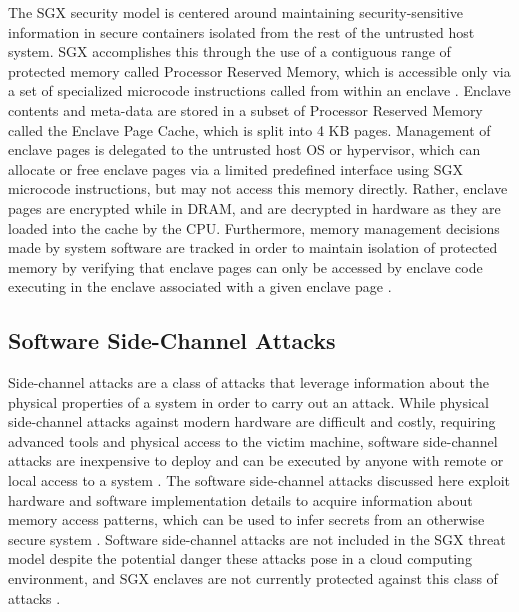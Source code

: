 The SGX security model is centered around maintaining security-sensitive information in secure containers isolated from the rest of the untrusted host system. SGX accomplishes this through the use of a contiguous range of protected memory called Processor Reserved Memory, which is accessible only via a set of specialized microcode instructions called from within an enclave \cite{costan_intel_2016}. Enclave contents and meta-data are stored in a subset of Processor Reserved Memory called the Enclave Page Cache, which is split into 4 KB pages. Management of enclave pages is delegated to the untrusted host OS or hypervisor, which can allocate or free enclave pages via a limited predefined interface using SGX microcode instructions, but may not access this memory directly. Rather, enclave pages are encrypted while in DRAM, and are decrypted in hardware as they are loaded into the cache by the CPU. Furthermore, memory management decisions made by system software are tracked in order to maintain isolation of protected memory by verifying that enclave pages can only be accessed by enclave code executing in the enclave associated with a given enclave page \cite{intel_corporation_intel_2016, costan_intel_2016, moghimi_cachezoom:_2017}. 

\subsection{Software Side-Channel Attacks}

Side-channel attacks are a class of attacks that leverage information about the physical properties of a system in order to carry out an attack. While physical side-channel attacks against modern hardware are difficult and costly, requiring advanced tools and physical access to the victim machine, software side-channel attacks are inexpensive to deploy and can be executed by anyone with remote or local access to a system \cite{costan_intel_2016}. The software side-channel attacks discussed here exploit hardware and software implementation details to acquire information about memory access patterns, which can be used to infer secrets from an otherwise secure system \cite{gotzfried_cache_2017, schwarz_malware_2017, xu_controlled-channel_2015, shinde_preventing_2015}. Software side-channel attacks are not included in the SGX threat model despite the potential danger these attacks pose in a cloud computing environment, and SGX enclaves are not currently protected against this class of attacks \cite{moghimi_cachezoom:_2017, intel_corporation_tutorial_2015}.

